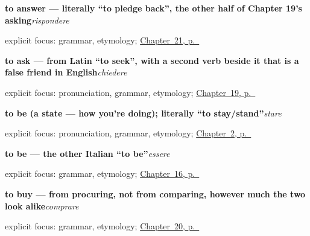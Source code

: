 \noindent\begin{minipage}[t]{\linewidth}
\raggedright
\textbf{to answer — literally \textquotedblleft{}to pledge back\textquotedblright{}, the other half of Chapter 19's asking}\enspace\emph{rispondere}\par
\footnotesize explicit focus: grammar, etymology; \hyperref[ch:it-play-get-answer]{Chapter~21, p.~\pageref*{ch:it-play-get-answer}}
\end{minipage}\par\smallskip

\noindent\begin{minipage}[t]{\linewidth}
\raggedright
\textbf{to ask — from Latin \textquotedblleft{}to seek\textquotedblright{}, with a second verb beside it that is a false friend in English}\enspace\emph{chiedere}\par
\footnotesize explicit focus: pronunciation, grammar, etymology; \hyperref[ch:it-backwards-verb]{Chapter~19, p.~\pageref*{ch:it-backwards-verb}}
\end{minipage}\par\smallskip

\noindent\begin{minipage}[t]{\linewidth}
\raggedright
\textbf{to be (a state — how you're doing); literally \textquotedblleft{}to stay/stand\textquotedblright{}}\enspace\emph{stare}\par
\footnotesize explicit focus: pronunciation, grammar, etymology; \hyperref[ch:it-how-are-you]{Chapter~2, p.~\pageref*{ch:it-how-are-you}}
\end{minipage}\par\smallskip

\noindent\begin{minipage}[t]{\linewidth}
\raggedright
\textbf{to be — the other Italian “to be”}\enspace\emph{essere}\par
\footnotesize explicit focus: grammar, etymology; \hyperref[ch:it-essere-andare-past]{Chapter~16, p.~\pageref*{ch:it-essere-andare-past}}
\end{minipage}\par\smallskip

\noindent\begin{minipage}[t]{\linewidth}
\raggedright
\textbf{to buy — from procuring, not from comparing, however much the two look alike}\enspace\emph{comprare}\par
\footnotesize explicit focus: grammar, etymology; \hyperref[ch:it-carry-buy-wait-meet]{Chapter~20, p.~\pageref*{ch:it-carry-buy-wait-meet}}
\end{minipage}\par\smallskip

